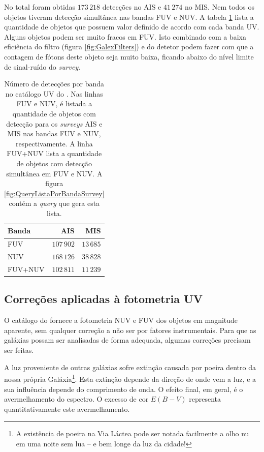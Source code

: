 No total foram obtidas $173\,218$ detecções no AIS e $41\,274$ no MIS. Nem todos
os objetos tiveram detecção simultânea nas bandas FUV e NUV. A tabela
\ref{tab:DetBanda} lista a quantidade de objetos que possuem valor definido de
acordo com cada banda UV. Alguns objetos podem ser muito fracos em FUV. Isto
combinado com a baixa eficiência do filtro (figura \ref{fig:GalexFilters}) e do
detetor podem fazer com que a contagem de fótons deste objeto seja muito baixa,
ficando abaixo do nível limite de sinal-ruído do {\em survey}.

\begin{table}
	\caption[Número de detecções por banda no catálogo UV do \STARLIGHT.]
	{Número de detecções por banda no catálogo UV do \starlight. Nas linhas FUV e
	NUV, é listada a quantidade de objetos com detecção para os {\em
	surveys} AIS e MIS nas bandas FUV e NUV, respectivamente. A linha FUV+NUV
	lista a quantidade de objetos com detecção simultânea em FUV e NUV. A figura
	\ref{fig:QueryListaPorBandaSurvey} contém a {\em query} que gera esta lista.}
	\setlength{\tabcolsep}{1cm}
	\begin{tabular}{l r r}
		Banda   &        AIS &       MIS \\
		\midrule
		FUV     & $107\,902$ & $13\,685$ \\
		NUV     & $168\,126$ & $38\,828$ \\
		FUV+NUV & $102\,811$ & $11\,239$ \\
	\end{tabular}
	\label{tab:DetBanda}
\end{table}

\subsection{Correções aplicadas à fotometria UV}
\label{sec:Crossmatch:DefAmostras:Correcoes}

O catálogo do \galex fornece a fotometria NUV e FUV dos objetos em magnitude
aparente, sem qualquer correção a não ser por fatores instrumentais. Para que as
galáxias possam ser analisadas de forma adequada, algumas correções precisam ser
feitas.

A luz proveniente de outras galáxias sofre extinção causada por poeira dentro da
nossa própria Galáxia\footnote{A existência de poeira na Via Láctea pode ser
notada facilmente a olho nu em uma noite sem lua -- e bem longe da luz da
cidade!}. Esta extinção depende da direção de onde vem a luz, e a sua influência
depende do comprimento de onda. O efeito final, em geral, é o avermelhamento do
espectro. O excesso de cor $E(B-V)$ representa quantitativamente este
avermelhamento.

